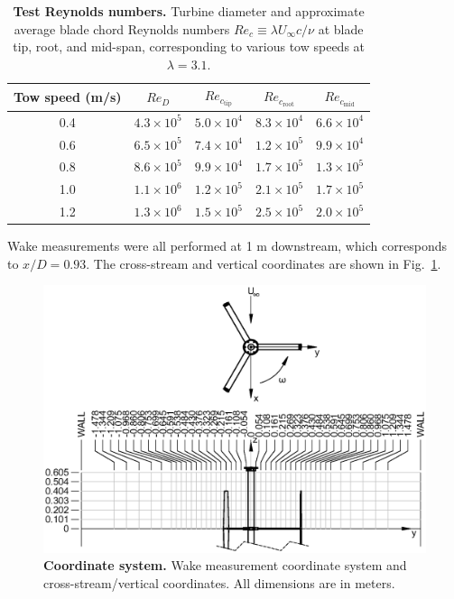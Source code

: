 \documentclass[10pt,letterpaper]{article}
\begin{document}
\begin{table}[ht]
\centering
\begin{tabular}{c|c|c|c|c}
Tow speed (m/s) & $Re_D$ & $Re_{c_\mathrm{tip}}$ & $Re_{c_\mathrm{root}}$ & $Re_{c_\mathrm{mid}}$\\
\hline
0.4 & $4.3 \times 10^5$ & $5.0 \times 10^4$ & $8.3 \times 10^4$ & $6.6 \times 10^4$ \\
0.6 & $6.5 \times 10^5$ & $7.4 \times 10^4$ & $1.2 \times 10^5$ & $9.9 \times 10^4$ \\
0.8 & $8.6 \times 10^5$ & $9.9 \times 10^4$ & $1.7 \times 10^5$ & $1.3 \times 10^5$ \\
1.0 & $1.1 \times 10^6$ & $1.2 \times 10^5$ & $2.1 \times 10^5$ & $1.7 \times 10^5$ \\
1.2 & $1.3 \times 10^6$ & $1.5 \times 10^5$ & $2.5 \times 10^5$ & $2.0 \times 10^5$ \\
\end{tabular}

\caption{{\bf Test Reynolds numbers.} Turbine diameter and approximate average
blade chord Reynolds numbers $Re_c \equiv \lambda U_\infty c / \nu$ at blade
tip, root, and mid-span, corresponding to various tow speeds at $\lambda=3.1$.}

\label{tab:re}
\end{table}


Wake measurements were all performed at 1 m downstream, which corresponds to
$x/D = 0.93$. The cross-stream and vertical coordinates are shown in
Fig.~\ref{fig:coordinates}.

\begin{figure}[h]
    \includegraphics[width=\textwidth]{figures/turbine_coordinate_system.eps}

    \caption{{\bf Coordinate system.} Wake measurement coordinate system and
    cross-stream/vertical coordinates. All dimensions are in meters.}

    \label{fig:coordinates}
\end{figure}
\end{document}

